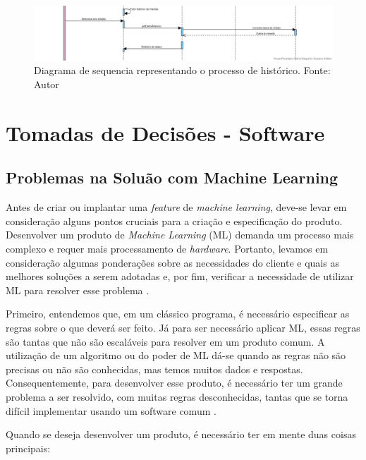 \begin{apendicesenv}
\begin{figure}[htb]
    \centering
    \includegraphics[width=1\textwidth, angle=0]{figuras/diagrama_sequencia_historico.png}
    \caption{Diagrama de sequencia representando o processo de histórico. Fonte: Autor}
    \label{fig:Diagrama_sequencia_historico}
\end{figure}

\chapter{Tomadas de Decisões - Software}

\section{Problemas na Soluão com Machine Learning}
\label{problema_solucao_ml}

\par Antes de criar ou implantar uma \textit{feature} de \textit{machine learning}, deve-se levar em consideração alguns pontos cruciais para a criação e especificação do produto. Desenvolver um produto de \textit{Machine Learning} (ML) demanda um processo mais complexo e requer mais processamento de \textit{hardware}. Portanto, levamos em consideração algumas ponderações sobre as necessidades do cliente e quais as melhores soluções a serem adotadas e, por fim, verificar a necessidade de utilizar ML para resolver esse problema \cite{shams2018developing}.

\par Primeiro, entendemos que, em um clássico programa, é necessário especificar as regras sobre o que deverá ser feito. Já para ser necessário aplicar ML, essas regras são tantas que não são escaláveis para resolver em um produto comum. A utilização de um algoritmo ou do poder de ML dá-se quando as regras não são precisas ou não são conhecidas, mas temos muitos dados e respostas. Consequentemente, para desenvolver esse produto, é necessário ter um grande problema a ser resolvido, com muitas regras desconhecidas, tantas que se torna difícil implementar usando um software comum \cite{amershi2019software}. 

\par Quando se deseja desenvolver um produto, é necessário ter em mente duas coisas principais:


\end{apendicesenv}
